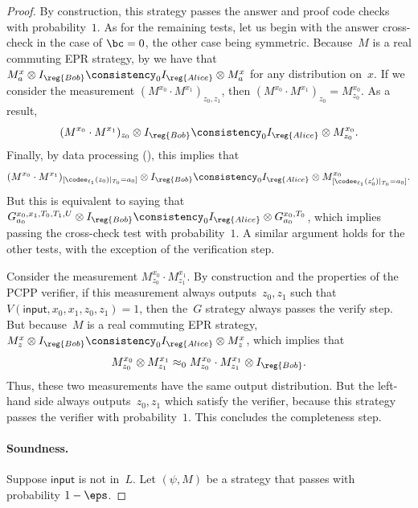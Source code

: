\begin{proof}
By construction, this strategy passes the answer and proof code checks with probability~$1$.
As for the remaining tests, let us begin with the answer cross-check in the case of $\bc = 0$, the other case being symmetric.
Because~$M$ is a real commuting EPR strategy,
by 
we have that $M^x_a \otimes I_{\reg{Bob}} \consistency_0 I_{\reg{Alice}} \otimes M^x_a$ for any distribution on~$x$.
If we consider the measurement $(M^{x_0} \cdot M^{x_1})_{z_0, z_1}$, then $(M^{x_0} \cdot M^{x_1})_{z_0} = M^{x_0}_{z_0}$. As a result,
\begin{equation*}
(M^{x_0} \cdot M^{x_1})_{z_0} \otimes I_{\reg{Bob}}
\consistency_0 I_{\reg{Alice}} \otimes M^{x_0}_{z_0}.
\end{equation*}
Finally, by data processing (), this implies that
\begin{equation*}
(M^{x_0} \cdot M^{x_1})_{[\codee_{\ell_1}(z_0)|_{T_0}=a_0]} \otimes I_{\reg{Bob}}
\consistency_0 I_{\reg{Alice}} \otimes M^{x_0}_{[\codee_{\ell_1}(z_0')|_{T_0} = a_0]}.
\end{equation*}
But this is equivalent to saying that $G^{x_0, x_1, T_0, T_1, U}_{a_0} \otimes I_{\reg{Bob}} \consistency_0 I_{\reg{Alice}} \otimes G^{x_0, T_0}_{a_0}$,
which implies passing the cross-check test with probability~$1$.
A similar argument holds for the other tests, with the exception of the verification step.

Consider the measurement $M^{x_0}_{z_0} \cdot M^{x_1}_{z_1}$.
By construction and the properties of the PCPP verifier, if this measurement always outputs~$z_0, z_1$ such that $V(\mathsf{input}, x_0, x_1, z_0, z_1) = 1$,
then the~$G$ strategy always passes the verify step.
But because~$M$ is a real commuting EPR strategy,
$M^x_z \otimes I_{\reg{Bob}} \consistency_0 I_{\reg{Alice}} \otimes M^x_z$,
which implies that
\begin{equation*}
M^{x_0}_{z_0} \otimes M^{x_1}_{z_1}
\approx_0 M^{x_0}_{z_0} \cdot M^{x_1}_{z_1} \otimes I_{\reg{Bob}}.
\end{equation*}
Thus, these two measurements have the same output distribution.
But the left-hand side always outputs~$z_0, z_1$ which satisfy the verifier, because this strategy passes the verifier with probability~$1$.
This concludes the completeness step.


\paragraph{Soundness.}
Suppose $\mathsf{input}$ is not in~$L$.
Let $(\psi, M)$ be a strategy that passes with probability $1-\eps$.



\end{proof}
